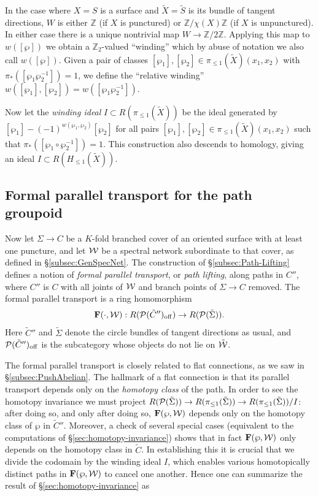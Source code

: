 \documentclass[11pt,a4paper]{article}
\def\Z{{\mathbb{Z}}}
\def\CP {{\cal P }}
\def\wnet {{\cal W}}
\def\bF{\mathbf{F}}
\def\CP {{\cal P }}
\def\wnet {{\cal W}}
\newcommand\off{{\mathrm{off}}}
\begin{document}
In the case where $X = S$ is a surface and $\tilde X = \tilde S$
is its bundle of tangent directions,
$W$ is either $\Z$ (if $X$ is punctured)
or $\Z / \chi(X) \Z$ (if $X$ is unpunctured).  In either case
there is a unique nontrivial map $W \to \Z / 2\Z$.  Applying this map to $w([\wp])$
we obtain a $\Z_2$-valued ``winding'' which by abuse of notation we also
call $w([\wp])$.  Given a pair of classes $[\wp_1],[\wp_2]\in
\pi_{\leq 1}(\tilde X)(x_1,x_2)$ with $\pi_*([\wp_1 \wp_2^{-1}]) = 1$,
we define the ``relative winding'' $w([\wp_1], [\wp_2]) = w([\wp_1 \wp_2^{-1}])$.

Now let the \emph{winding ideal} $I \subset R(\pi_{\leq 1}(\tilde X))$ be
the ideal generated by $[\wp_1] - (-1)^{w(\wp_1,\wp_2)} [\wp_2]$ for all pairs $[\wp_1],[\wp_2]\in
\pi_{\leq 1}(\tilde X)(x_1,x_2)$
such that  $\pi_*([\wp_1\circ \wp_2^{-1}])=1$.
This construction also descends to homology, giving an ideal $I \subset R(H_{\leq 1}(\tilde X))$.



\subsection{Formal parallel transport for the path groupoid}\label{subsec:formal-pt-path}

Now let $\Sigma \to C$ be a $K$-fold branched cover of an
oriented surface with at least one puncture, and let $\wnet$
be a spectral network subordinate to that cover, as defined in
\S\ref{subsec:GenSpecNet}.
The construction of \S\ref{subsec:Path-Lifting} defines a notion of \emph{formal parallel transport},
or \emph{path lifting}, along paths in $C''$, where $C''$ is $C$ with all joints of $\wnet$ and branch points of $\Sigma \to C$
removed.  The formal parallel transport is a ring homomorphism
\begin{equation}\label{eq:2d4d-deg-2}
\bF(\cdot, \wnet): R(\CP(\tilde C'')_{\off}) \to R(\CP(\tilde \Sigma)).
\end{equation}
Here $\tilde C''$ and $\tilde \Sigma$ denote the
circle bundles of tangent directions as usual, and $\CP(\tilde C'')_{\off}$ is the subcategory
whose objects do not lie on $\tilde\wnet$.

The formal parallel transport is closely related to flat connections,
as we saw in \S \ref{subsec:PushAbelian}.
The hallmark of a flat connection is that its parallel transport depends only on
the \emph{homotopy class} of the path. In order to see the homotopy
invariance   we must
project $R(\CP(\tilde \Sigma)) \to R(\pi_{\leq 1}(\tilde \Sigma)) \to R(\pi_{\leq 1}(\tilde \Sigma))/I$:
after doing so, and only after doing so, $\bF(\wp, \wnet)$   depends only on the
homotopy class of  $\wp$ in $\tilde C''$. Moreover, a check of
several special cases (equivalent to the computations of \S\ref{sec:homotopy-invariance})
shows that in fact $\bF(\wp, \wnet)$ only depends on the homotopy class
in $\tilde C$.  In establishing this it is crucial that we divide the codomain by
the winding ideal $I$, which enables various homotopically distinct paths in $\bF(\wp, \wnet)$ to
cancel one another.  Hence one can summarize the result of \S \ref{sec:homotopy-invariance} as
\end{document}
